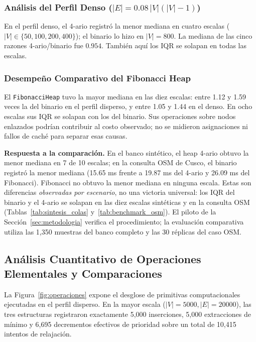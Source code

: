 \subsubsection{Análisis del Perfil Denso ($|E| = 0.08\,|V|(|V|-1)$)}
En el perfil denso, el 4-ario registró la menor mediana en cuatro escalas ($|V| \in \{50, 100, 200, 400\}$); el binario lo hizo en $|V|=800$. La mediana de las cinco razones 4-ario/binario fue $0.954$. También aquí los IQR se solapan en todas las escalas.

\subsubsection{Desempeño Comparativo del Fibonacci Heap}
El \texttt{FibonacciHeap} tuvo la mayor mediana en las diez escalas: entre 1.12 y 1.59 veces la del binario en el perfil disperso, y entre 1.05 y 1.44 en el denso. En ocho escalas sus IQR se solapan con los del binario. Sus operaciones sobre nodos enlazados podrían contribuir al costo observado; no se midieron asignaciones ni fallos de caché para separar esas causas.



\noindent\textbf{Respuesta a la comparación.} En el banco sintético, el heap 4-ario obtuvo la menor mediana en 7 de 10 escalas; en la consulta OSM de Cusco, el binario registró la menor mediana (15.65 ms frente a 19.87 ms del 4-ario y 26.09 ms del Fibonacci). Fibonacci no obtuvo la menor mediana en ninguna escala. Estas son diferencias \emph{observadas por escenario}, no una victoria universal: los IQR del binario y el 4-ario se solapan en las diez escalas sintéticas y en la consulta OSM (Tablas~\ref{tab:sintesis_colas} y~\ref{tab:benchmark_osm}). El piloto de la Sección~\ref{sec:metodologia} verifica el procedimiento; la evaluación comparativa utiliza las 1,350 muestras del banco completo y las 30 réplicas del caso OSM.

\subsection{Análisis Cuantitativo de Operaciones Elementales y Comparaciones}
La Figura~\ref{fig:operaciones} expone el desglose de primitivas computacionales ejecutadas en el perfil disperso. En la mayor escala ($|V|=5000, |E|=20000$), las tres estructuras registraron exactamente 5,000 inserciones, 5,000 extracciones de mínimo y 6,695 decrementos efectivos de prioridad sobre un total de 10,415 intentos de relajación.

